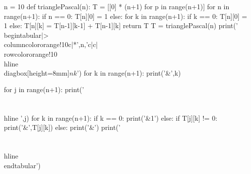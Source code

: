 \documentclass[10pt,a0paper,landscape]{article}
\newcommand{\dashed}{\tikz[baseline=1mm]\draw[gray!50,dashed](0,0)--(0,0.5);}
\begin{document}
\begin{pycode}
n = 10
def trianglePascal(n):
    T = [[0] * (n+1) for p in range(n+1)]
    for n in range(n+1):
        if n == 0:
            T[n][0] = 1
        else:
            for k in range(n+1):
                if k == 0:
                    T[n][0] = 1
                else:
                    T[n][k] = T[n-1][k-1] + T[n-1][k]
    return T
T = trianglePascal(n)
print('\\begin{tabular}{|>{\\columncolor{orange!10}}c|*{',n,'}{c!{\\dashed}}c|}\\rowcolor{orange!10}\\hline\\diagbox[height=8mm]{$n$}{$k$}')
for k in range(n+1):
    print('&',k)
    
for j in range(n+1):
    print('\\\\\\hline ',j)
    for k in range(n+1):
        if k == 0:
            print('&1')
        else:
            if T[j][k] != 0:
                print('&',T[j][k])
            else:
                print('&')
print('\\\\\\hline\\end{tabular}')
\end{pycode} 
\end{document}
